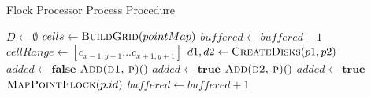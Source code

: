 \begin{algorithm}[h!]
\caption{Flock Processor Process Procedure}
\label{alg:fp}
\begin{algorithmic}[1]
        \State $D \gets \emptyset$
        \State $cells \gets \Call{BuildGrid}{pointMap}$
            \State {}
            \State $buffered \gets buffered - 1$
        \EndIf
            \State $cellRange \gets [c_{x - 1, y - 1}...c_{x + 1, y+ 1}]$
                        \State $d1, d2 \gets \Call{CreateDisks}{p1, p2}$
                            \State $added \gets \textbf{false}$
                                \State $\Call{Add(d1, p)}$
                                \State $added \gets \textbf{true}$
                            \EndIf
                                \State $\Call{Add(d2, p)}$
                                \State $added \gets \textbf{true}$
                            \EndIf
                                \State $\Call{MapPointFlock}{p.id}$
                            \EndIf
                        \EndFor
                        \State {}
                        \State {}
                    \EndIf
                \EndFor
            \EndFor
        \EndFor
        \State $buffered \gets buffered + 1$
    \EndProcedure
\end{algorithmic}
\end{algorithm}

